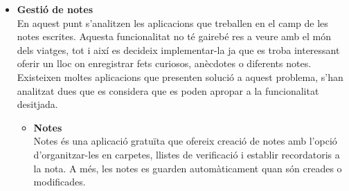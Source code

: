 \begin{itemize}
\begin{itemize}
\end{itemize}
\item{\textbf{Gestió de notes}}\\
En aquest punt s’analitzen les aplicacions que treballen en el camp de les notes escrites. Aquesta funcionalitat no té gairebé res a veure amb el món dels viatges, tot i així es decideix implementar-la ja que es troba interessant oferir un lloc on enregistrar fets curiosos, anècdotes o diferents notes.\\
Existeixen moltes aplicacions que presenten solució a aquest problema, s’han analitzat dues que es considera que es poden apropar a la funcionalitat desitjada.
\begin{itemize}
\item{\textbf{Notes}}\\
Notes és una aplicació gratuïta que ofereix creació de notes amb l’opció d’organitzar-les en carpetes, llistes de verificació i establir recordatoris a la nota. A més, les notes es guarden automàticament quan són creades o modificades. 

\clearpage


\end{itemize}
\end{itemize}
